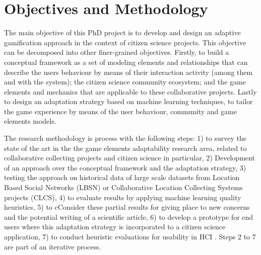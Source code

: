 \documentclass[sigconf]{acmart}
\begin{document}
\section{Objectives and Methodology}


The main objective of this PhD project is to develop and design an adaptive gamification approach in the context of citizen science projects. This objective can be decomposed into other finer-grained objectives. Firstly, to build a conceptual framework as a set of modeling elements and relationships that can describe the users behaviour by means of their interaction activity (among them and with the system); the citizen science community ecosystem; and the game elements and mechanics that are applicable to these collaborative projects. Lastly to design an adaptation strategy based on machine learning techniques, to tailor the game experience by means of the user behaviour, community and game elements models.




The research methodology is process with the following steps: 1) to survey the state of the art in the the game elements adaptability research area, related to collaborative collecting projects and citizen science in particular, 2) Development of an approach over the conceptual framework and the adaptation strategy,  3) testing the approach on historical data of large scale datasets from Location Based Social Networks (LBSN) or Collaborative Location Collecting Systems projects (CLCS), 4)  to evaluate results by applying machine learning quality heuristics, 5) to cConsider these partial results for giving place to new concerns and the potential writing of a scientific article, 6) to develop a prototype for end users where this adaptation strategy is incorporated to a citizen science application, 7) to conduct heuristic evaluations for usability in HCI \cite{Nielsen1990}.  Steps 2 to 7 are part of an iterative process.
\end{document}
